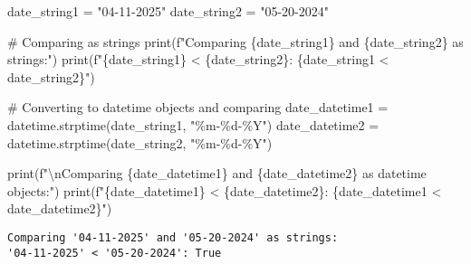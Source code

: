 \documentclass[
  letterpaper,
  DIV=11,
  numbers=noendperiod]{scrartcl}
\newenvironment{Shaded}{\begin{snugshade}}{\end{snugshade}}
\newcommand{\BuiltInTok}[1]{\textcolor[rgb]{0.00,0.23,0.31}{#1}}
\newcommand{\CharTok}[1]{\textcolor[rgb]{0.13,0.47,0.30}{#1}}
\newcommand{\CommentTok}[1]{\textcolor[rgb]{0.37,0.37,0.37}{#1}}
\newcommand{\NormalTok}[1]{\textcolor[rgb]{0.00,0.23,0.31}{#1}}
\newcommand{\OperatorTok}[1]{\textcolor[rgb]{0.37,0.37,0.37}{#1}}
\newcommand{\SpecialCharTok}[1]{\textcolor[rgb]{0.37,0.37,0.37}{#1}}
\newcommand{\SpecialStringTok}[1]{\textcolor[rgb]{0.13,0.47,0.30}{#1}}
\newcommand{\StringTok}[1]{\textcolor[rgb]{0.13,0.47,0.30}{#1}}
\begin{document}
\begin{tcolorbox}
\begin{Shaded}
\begin{Highlighting}[]
\NormalTok{date\_string1 }\OperatorTok{=} \StringTok{"04{-}11{-}2025"}
\NormalTok{date\_string2 }\OperatorTok{=} \StringTok{"05{-}20{-}2024"}

\CommentTok{\# Comparing as strings}
\BuiltInTok{print}\NormalTok{(}\SpecialStringTok{f"Comparing \textquotesingle{}}\SpecialCharTok{\{}\NormalTok{date\_string1}\SpecialCharTok{\}}\SpecialStringTok{\textquotesingle{} and \textquotesingle{}}\SpecialCharTok{\{}\NormalTok{date\_string2}\SpecialCharTok{\}}\SpecialStringTok{\textquotesingle{} as strings:"}\NormalTok{)}
\BuiltInTok{print}\NormalTok{(}\SpecialStringTok{f"\textquotesingle{}}\SpecialCharTok{\{}\NormalTok{date\_string1}\SpecialCharTok{\}}\SpecialStringTok{\textquotesingle{} \textless{} \textquotesingle{}}\SpecialCharTok{\{}\NormalTok{date\_string2}\SpecialCharTok{\}}\SpecialStringTok{\textquotesingle{}: }\SpecialCharTok{\{}\NormalTok{date\_string1 }\OperatorTok{\textless{}}\NormalTok{ date\_string2}\SpecialCharTok{\}}\SpecialStringTok{"}\NormalTok{)}

\CommentTok{\# Converting to datetime objects and comparing}
\NormalTok{date\_datetime1 }\OperatorTok{=}\NormalTok{ datetime.strptime(date\_string1, }\StringTok{"\%m{-}}\SpecialCharTok{\%d}\StringTok{{-}\%Y"}\NormalTok{)}
\NormalTok{date\_datetime2 }\OperatorTok{=}\NormalTok{ datetime.strptime(date\_string2, }\StringTok{"\%m{-}}\SpecialCharTok{\%d}\StringTok{{-}\%Y"}\NormalTok{)}

\BuiltInTok{print}\NormalTok{(}\SpecialStringTok{f"}\CharTok{\textbackslash{}n}\SpecialStringTok{Comparing }\SpecialCharTok{\{}\NormalTok{date\_datetime1}\SpecialCharTok{\}}\SpecialStringTok{ and }\SpecialCharTok{\{}\NormalTok{date\_datetime2}\SpecialCharTok{\}}\SpecialStringTok{ as datetime objects:"}\NormalTok{)}
\BuiltInTok{print}\NormalTok{(}\SpecialStringTok{f"}\SpecialCharTok{\{}\NormalTok{date\_datetime1}\SpecialCharTok{\}}\SpecialStringTok{ \textless{} }\SpecialCharTok{\{}\NormalTok{date\_datetime2}\SpecialCharTok{\}}\SpecialStringTok{: }\SpecialCharTok{\{}\NormalTok{date\_datetime1 }\OperatorTok{\textless{}}\NormalTok{ date\_datetime2}\SpecialCharTok{\}}\SpecialStringTok{"}\NormalTok{)}
\end{Highlighting}
\end{Shaded}

\begin{verbatim}
Comparing '04-11-2025' and '05-20-2024' as strings:
'04-11-2025' < '05-20-2024': True


\end{verbatim}
\end{tcolorbox}
\end{document}

